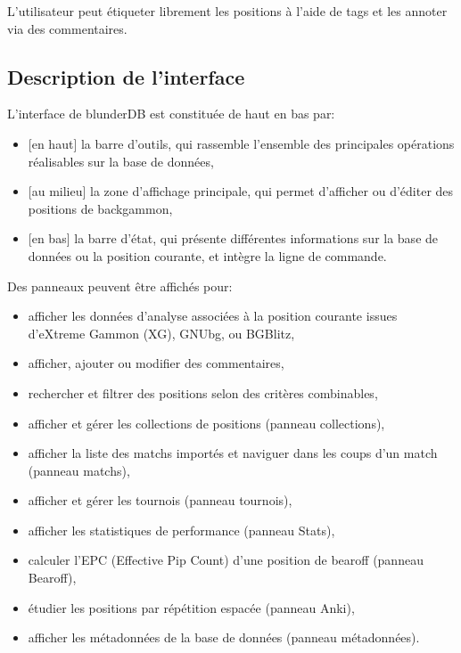 \documentclass[letterpaper,10pt,french]{sphinxmanual}
\begin{document}
\sphinxAtStartPar
L’utilisateur peut étiqueter librement les positions à l’aide de tags et les
annoter via des commentaires.


\subsection{Description de l’interface}
\label{\detokenize{manuel:description-de-l-interface}}
\sphinxAtStartPar
L’interface de blunderDB est constituée de haut en bas par:
\begin{itemize}
\item {} 
\sphinxAtStartPar
{[}en haut{]} la barre d’outils, qui rassemble l’ensemble des principales
opérations réalisables sur la base de données,

\item {} 
\sphinxAtStartPar
{[}au milieu{]} la zone d’affichage principale, qui permet d’afficher ou d’éditer des
positions de backgammon,

\item {} 
\sphinxAtStartPar
{[}en bas{]} la barre d’état, qui présente différentes informations sur la
base de données ou la position courante, et intègre la ligne de commande.

\end{itemize}

\sphinxAtStartPar
Des panneaux peuvent être affichés pour:
\begin{itemize}
\item {} 
\sphinxAtStartPar
afficher les données d’analyse associées à la position courante issues
d’eXtreme Gammon (XG), GNUbg, ou BGBlitz,

\item {} 
\sphinxAtStartPar
afficher, ajouter ou modifier des commentaires,

\item {} 
\sphinxAtStartPar
rechercher et filtrer des positions selon des critères combinables,

\item {} 
\sphinxAtStartPar
afficher et gérer les collections de positions (panneau collections),

\item {} 
\sphinxAtStartPar
afficher la liste des matchs importés et naviguer dans les coups d’un match (panneau matchs),

\item {} 
\sphinxAtStartPar
afficher et gérer les tournois (panneau tournois),

\item {} 
\sphinxAtStartPar
afficher les statistiques de performance (panneau Stats),

\item {} 
\sphinxAtStartPar
calculer l’EPC (Effective Pip Count) d’une position de bearoff (panneau Bearoff),

\item {} 
\sphinxAtStartPar
étudier les positions par répétition espacée (panneau Anki),

\item {} 
\sphinxAtStartPar
afficher les métadonnées de la base de données (panneau métadonnées).

\end{itemize}
\end{document}
